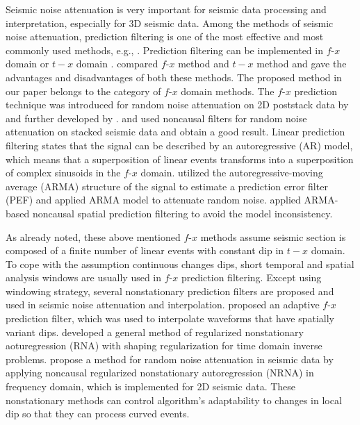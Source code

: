 Seismic noise attenuation is very important for seismic data processing and 
interpretation, especially for 3D seismic data. Among the methods of seismic 
noise attenuation, prediction filtering is one of the most effective and most 
commonly used methods, e.g., \cite []{Gulunay1986, Galbraith1991, Gulunay1993, 
Sacchi2001}. Prediction filtering can be implemented in $f$-$x$ 
domain or $t-x$ domain \cite[]{Hornbostel1991, Abma1995}. \cite{Abma1995}
compared $f$-$x$ method and $t-x$ method and gave the advantages 
and disadvantages of both these methods. The proposed method in our paper 
belongs to the category of $f$-$x$ domain methods. The $f$-$x$ prediction technique 
was introduced for random noise attenuation on 2D poststack data by \cite{Canales1984}
and further developed by \cite{Gulunay1986}. \cite{Wang1991} and 
\cite{Hornbostel1991} used noncausal filters for random noise attenuation on 
stacked seismic data and obtain a good result. Linear prediction filtering 
states that the signal can be described by an autoregressive (AR) model, 
which means that a superposition of linear events transforms into a 
superposition of complex sinusoids in the $f$-$x$ domain. \cite{Sacchi2001} 
utilized the autoregressive-moving average (ARMA) structure of 
the signal to estimate a prediction error filter (PEF) and applied ARMA 
model to attenuate random noise. \cite{Liu2009} applied ARMA-based 
noncausal spatial prediction filtering to avoid the model inconsistency.
 
As already noted, these above mentioned $f$-$x$ methods assume seismic section 
is composed of a finite number of linear events with constant dip in $t-x$ 
domain. To cope with the assumption continuous changes dips, short temporal 
and spatial analysis windows are usually used in $f$-$x$ prediction filtering. 
Except using windowing strategy, several nonstationary prediction filters 
are proposed and used in seismic noise attenuation and interpolation. 
\cite{Naghizadeh2009} proposed an adaptive $f$-$x$ prediction filter, 
which was used to interpolate waveforms that have spatially variant dips. 
\cite{Fomel2009} developed a general method of regularized nonstationary 
aoturegression (RNA) with shaping regularization \cite[]{Fomel2007} for 
time domain inverse problems. \cite{Liu2012} propose a method for 
random noise attenuation in seismic data by applying noncausal 
regularized nonstationary autoregression (NRNA) in frequency domain, 
which is implemented for 2D seismic data. These nonstationary methods 
can control algorithm’s adaptability to changes in local dip so that 
they can process curved events.
 
